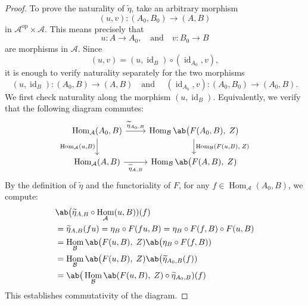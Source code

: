 \documentclass[12pt, english]{article}
\numberwithin{equation}{section}
\DeclareMathOperator{\Hom}{Hom}
\DeclareMathOperator{\id}{id}
\DeclareMathOperator{\opp}{op}
\theoremstyle{plain}
\theoremstyle{definition}
\theoremstyle{remark}
\begin{document}
	\begin{proof}
		
		To prove the naturality of $\widetilde{\eta}$, take an arbitrary morphism
		\[
		(u, v) \colon (A_0, B_0) \longrightarrow (A, B)
		\]
		in $ \mathcal{A}^{\opp} \times\mathcal{A}$. This means precisely that
		\[
		u \colon A \to A_0, \quad \text{and} \quad v \colon B_0 \to B
		\]
		are morphisms in $\mathcal{A}$.
		Since
		\[
		(u, v) = (u, \id_B) \circ (\id_{A_0}, v),
		\]
		it is enough to verify naturality separately for the two morphisms
		\[
		(u, \id_B) \colon (A_0, B) \longrightarrow (A, B) \quad \text{and } \quad (\id_{A_0}, v) \colon (A_0, B_0) \longrightarrow (A_0, B).
		\]
		We first check naturality along the morphism $(u, \id_B)$.
		Equivalently, we verify that the following diagram commutes:
		\[
		\begin{tikzcd}
			{\Hom_{\mathcal{A}}(A_0, B)} \arrow[r, "{\widetilde{\eta}_{A_0,B}}"] \arrow[d, "{\Hom_{\mathcal{A}}(u, B)  }"']
			& {\Hom_{\mathcal{B}} \ab\big(F(A_0, B), \; Z)} \arrow[d, "{\Hom_{\mathcal{B}}(F(u, B), \;  Z)}"] \\
			{ \Hom_{\mathcal{A}}(A, B) } \arrow[r, "{\widetilde{\eta}_{A, B}}"'] & \Hom_{\mathcal{B}} \ab\big(F(A, B), \; Z)
		\end{tikzcd}
		\]
		By the definition of $\widetilde{\eta}$ and the functoriality of $F$,
		for any $f \in \Hom_{\mathcal{A}}(A_0, B)$, we compute:
		\begin{align*}
			& \ab\big(\widetilde{\eta}_{A, B} \circ \Hom_{\mathcal{A}}(u, B)) (f) \\
			& = \widetilde{\eta}_{A, B} (fu) = \eta_{B} \circ F(fu, B) = \eta_{B} \circ F(f, B) \circ F(u, B) \\
			& = \Hom_{\mathcal{B}} \ab\big(F(u, B), \; Z) \ab\big(\eta_{B} \circ F(f, B)) \\
			& = \Hom_{\mathcal{B}} \ab\big(F(u, B), \; Z) \ab\big(\widetilde{\eta}_{A_0, B} (f)) \\
			& = \ab\big(\Hom_{\mathcal{B}} \ab(F(u, B), \; Z) \circ \widetilde{\eta}_{A_0, B}) (f)
		\end{align*}
		This establishes commutativity of the diagram.
		

\end{proof}
\end{document}
